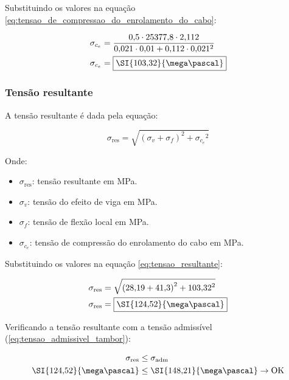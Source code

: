 \vspace{1em}

Substituindo os valores na equação \eqref{eq:tensao_de_compressao_do_enrolamento_do_cabo}:

\begin{align*}
  \sigma_{c_e} & = \frac{0{,}5 \cdot 25377{,}8 \cdot 2{,}112}{0{,}021 \cdot 0{,}01 + 0{,}112 \cdot 0{,}021^2} \\
  \sigma_{c_e} & = \boxed{\SI{103{,}32}{\mega\pascal}}
\end{align*}

\subsubsection{Tensão resultante}

A tensão resultante é dada pela equação:

\begin{equation}
  \sigma_{\text{res}} = \sqrt{{\left(\sigma_v + \sigma_f\right)}^2 + {\sigma_{c_e}}^2}
  \label{eq:tensao_resultante}
\end{equation}

Onde:

\begin{itemize}
  \item $\sigma_{\text{res}}$: tensão resultante em \si{\mega\pascal}.
  \item $\sigma_v$: tensão do efeito de viga em \si{\mega\pascal}.
  \item $\sigma_f$: tensão de flexão local em \si{\mega\pascal}.
  \item $\sigma_{c_e}$: tensão de compressão do enrolamento do cabo em \si{\mega\pascal}.
\end{itemize}

\vspace{1em}

Substituindo os valores na equação \eqref{eq:tensao_resultante}:

\begin{align*}
  \sigma_{\text{res}} & = \sqrt{{\left(28{,}19 + 41{,}3\right)}^2 + {103{,}32}^2} \\
  \sigma_{\text{res}} & = \boxed{\SI{124{,}52}{\mega\pascal}}
\end{align*}

Verificando a tensão resultante com a tensão admissível (\eqref{eq:tensao_admissivel_tambor}):

\begin{align*}
  \sigma_{\text{res}}       & \le \sigma_{\text{adm}}                             \\
  \SI{124{,}52}{\mega\pascal} & \le \SI{148{,}21}{\mega\pascal} \rightarrow \text{OK}
\end{align*}
